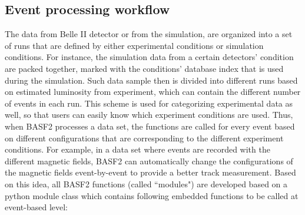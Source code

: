 \begin{comment}
As for the externals, it contains the many packages or libraries that provide functionalities BASF2 needs during the execution or installation. For example, some basic packages, like gcc compiler, cmake, tar, wget, Python and git are included. In particular, due to the dependence of the analysis tools that may be frequently used by Python, around 100 additional Python packages are installed as the externals, such as ``Numpy" and ``matplotlib" packages that provide functions for statistical calculations and plotting. The complexity of building all of these external software could be tough for users so that the compiled versions that cover the common platforms are available from BASF2 official repository. 
Tools are collections of shell or Python scripts for setting up BASF2 and externals environment. It can easily handle the need of setting up an environment of specific BASF2 version and the externals tied to that version. It also provides a function to setting up the environment of developing BASF2, where developers can get one developing copy of BASF2 and write the additional codes as the modification, so the compatibility of BASF2 could be easily maintained by building a release version from the developing branches. In this thesis, two new packages are developed and built with release-05-01-01 version BASF2. This developing version of BASF2 contains all functions that release-05-01-01 has. The details will be discussed later. 
\end{comment}

\subsection{Event processing workflow}
The data from Belle II detector or from the simulation, are organized into a set of runs that are defined by either experimental conditions or simulation conditions. For instance, the simulation data from a certain detectors' condition are packed together, marked with the conditions' database index that is used during the simulation.  Such data sample then is divided into different runs based on estimated luminosity from experiment, which can contain the different number of events in each run.  This scheme is used for categorizing experimental data as well, so that users can easily know which experiment conditions are used. Thus, when BASF2 processes a data set, the functions are called for every event based on different configurations that are corresponding to the different experiment conditions. For example, in a data set where events are recorded with the different magnetic fields, BASF2 can automatically change the configurations of the magnetic fields event-by-event to provide a better track measurement. Based on this idea, all BASF2 functions (called ``modules") are developed based on a python module class which contains following embedded functions to be called at event-based level: 


